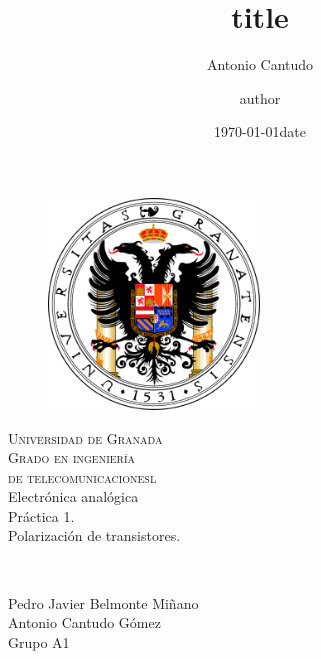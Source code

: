 \documentclass[11pt,a4paper]{article}
\author{Antonio Cantudo} %
\date{\today} %
\begin{document}
\title{title}
\author{author}
\date{date}

\begin{titlepage}
  \begin{figure}[t]
    \centering\includegraphics[width=0.5\textwidth]{ugrlogo}
  \end{figure}
  \begin{center}
    \textsc{ \Huge{Universidad de Granada \\}}
    \textsc{ \LARGE{Grado en ingeniería\\de telecomunicacionesl\\ }}
    \textnormal{ \LARGE{Electrónica analógica\\}}
    \vspace{30mm}
    \fontsize{20mm}{7mm}\selectfont
    \textup{Práctica 1.\\Polarización de transistores.}\\
  \end{center}

  \vspace{25mm}

  \begin{minipage}[t]{0.47\textwidth}
    \textnormal{\large{\bf \\}}
    {\large }
  \end{minipage}\hfill\begin{minipage}[t]{0.47\textwidth}\raggedleft
    {\Large{Pedro Javier Belmonte Miñano}\\
     \Large{Antonio Cantudo Gómez}\\
     \large{Grupo A1}}
  \end{minipage}

  \vspace{20mm}

\end{titlepage}
\end{document}
